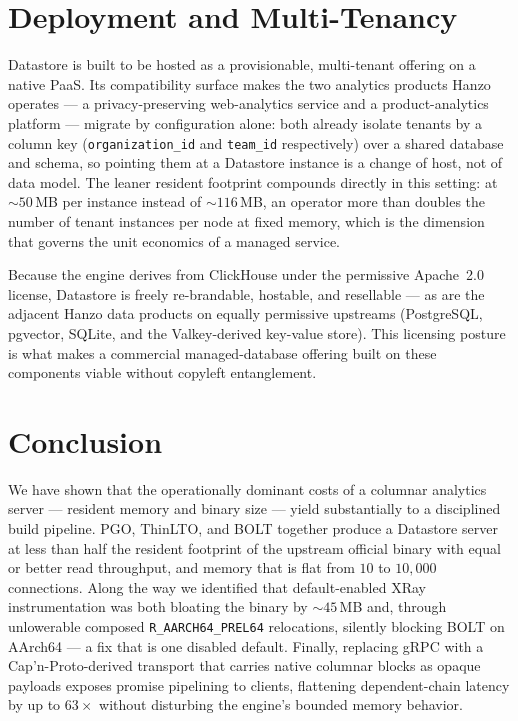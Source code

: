 \section{Deployment and Multi-Tenancy}

Datastore is built to be hosted as a provisionable, multi-tenant offering on a
native PaaS. Its compatibility surface makes the two analytics products Hanzo
operates --- a privacy-preserving web-analytics service and a product-analytics
platform --- migrate by configuration alone: both already isolate tenants by a
column key (\texttt{organization\_id} and \texttt{team\_id} respectively) over a
shared database and schema, so pointing them at a Datastore instance is a change
of host, not of data model. The leaner resident footprint compounds directly in
this setting: at $\sim\!50$\,MB per instance instead of $\sim\!116$\,MB, an
operator more than doubles the number of tenant instances per node at fixed
memory, which is the dimension that governs the unit economics of a managed
service.

Because the engine derives from ClickHouse under the permissive Apache~2.0
license, Datastore is freely re-brandable, hostable, and resellable --- as are
the adjacent Hanzo data products on equally permissive upstreams (PostgreSQL,
pgvector, SQLite, and the Valkey-derived key-value store). This
licensing posture is what makes a commercial managed-database offering built on
these components viable without copyleft entanglement.

\section{Conclusion}

We have shown that the operationally dominant costs of a columnar analytics
server --- resident memory and binary size --- yield substantially to a
disciplined build pipeline. PGO, ThinLTO, and BOLT together produce a Datastore
server at less than half the resident footprint of the upstream official binary
with equal or better read throughput, and memory that is flat from $10$ to
$10{,}000$ connections. Along the way we identified that default-enabled XRay
instrumentation was both bloating the binary by $\sim\!45$\,MB and, through
unlowerable composed \texttt{R\_AARCH64\_PREL64} relocations, silently blocking
BOLT on AArch64 --- a fix that is one disabled default. Finally, replacing gRPC
with a Cap'n-Proto-derived transport that carries native columnar blocks as
opaque payloads exposes promise pipelining to clients, flattening dependent-chain
latency by up to $63\times$ without disturbing the engine's bounded memory
behavior.

